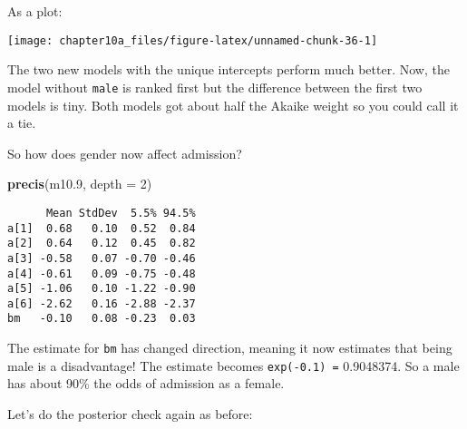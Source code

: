 \documentclass[]{tufte-handout}
\newenvironment{Shaded}{}{}
\newcommand{\KeywordTok}[1]{\textcolor[rgb]{0.00,0.44,0.13}{\textbf{#1}}}
\newcommand{\DataTypeTok}[1]{\textcolor[rgb]{0.56,0.13,0.00}{#1}}
\newcommand{\DecValTok}[1]{\textcolor[rgb]{0.25,0.63,0.44}{#1}}
\newcommand{\FloatTok}[1]{\textcolor[rgb]{0.25,0.63,0.44}{#1}}
\newcommand{\StringTok}[1]{\textcolor[rgb]{0.25,0.44,0.63}{#1}}
\newcommand{\OperatorTok}[1]{\textcolor[rgb]{0.40,0.40,0.40}{#1}}
\newcommand{\NormalTok}[1]{#1}
\begin{document}
As a plot:

\begin{Shaded}
\end{Shaded}

\texttt{[image: chapter10a\_files/figure-latex/unnamed-chunk-36-1]}

The two new models with the unique intercepts perform much better. Now,
the model without \texttt{male} is ranked first but the difference
between the first two models is tiny. Both models got about half the
Akaike weight so you could call it a tie.

So how does gender now affect admission?

\begin{Shaded}
\begin{Highlighting}[]
\KeywordTok{precis}\NormalTok{(m10}\FloatTok{.9}\NormalTok{, }\DataTypeTok{depth =} \DecValTok{2}\NormalTok{)}
\end{Highlighting}
\end{Shaded}

\begin{verbatim}
      Mean StdDev  5.5% 94.5%
a[1]  0.68   0.10  0.52  0.84
a[2]  0.64   0.12  0.45  0.82
a[3] -0.58   0.07 -0.70 -0.46
a[4] -0.61   0.09 -0.75 -0.48
a[5] -1.06   0.10 -1.22 -0.90
a[6] -2.62   0.16 -2.88 -2.37
bm   -0.10   0.08 -0.23  0.03
\end{verbatim}

The estimate for \texttt{bm} has changed direction, meaning it now
estimates that being male is a disadvantage! The estimate becomes
\texttt{exp(-0.1)\ =} 0.9048374. So a male has about 90\% the odds of
admission as a female.

Let's do the posterior check again as before:
\end{document}
